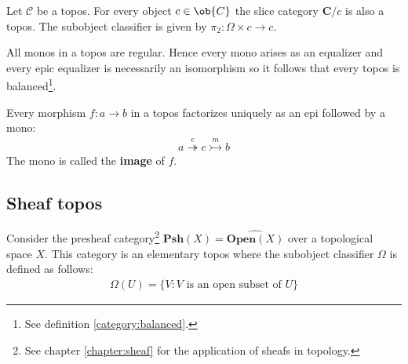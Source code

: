 	
	\begin{property}
		Let $\mathcal{C}$ be a topos. For every object $c\in\ob{C}$ the slice category $\mathbf{C}/c$ is also a topos. The subobject classifier is given by $\pi_2:\Omega\times c\rightarrow c$.
	\end{property}
	
	\begin{property}[Balanced]
		All monos in a topos are regular. Hence every mono arises as an equalizer and every epic equalizer is necessarily an isomorphism so it follows that every topos is balanced\footnote{See definition \ref{category:balanced}.}.
	\end{property}
	
	\begin{property}
		Every morphism $f:a\rightarrow b$ in a topos factorizes uniquely as an epi followed by a mono:
		\begin{gather}
			a\overset{e}{\twoheadrightarrow} c\overset{m}{\rightarrowtail} b
		\end{gather}
		The mono is called the \textbf{image} of $f$.
	\end{property}

\subsection{Sheaf topos}

	\begin{property}\label{topoi:sheaf_topos}
		Consider the presheaf category\footnote{See chapter \ref{chapter:sheaf} for the application of sheafs in topology.} $\textbf{Psh}(X) = \widehat{\textbf{Open}(X)}$ over a topological space $X$. This category is an elementary topos where the subobject classifier $\Omega$ is defined as follows:
		\begin{gather}
			\Omega(U) = \{V:V\text{ is an open subset of }U\}
		\end{gather}
	\end{property}
	
